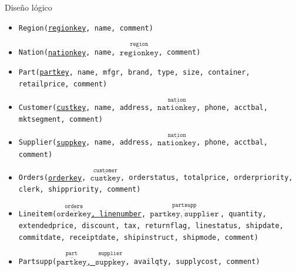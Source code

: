 \documentclass[10pt]{beamer}
\begin{document}
    \begin{frame}{Diseño lógico}
      \footnotesize
      \begin{itemize}
        \item \texttt{Region(\underline{regionkey}, name, comment)}
        \item \texttt{Nation(\underline{nationkey}, name, $\overset{
          \texttt{region}}{\overline{\texttt{regionkey}}}$, comment)}
        \item \texttt{Part(\underline{partkey}, name, mfgr, brand, type, size,
        container, retailprice, comment)}
        \item \texttt{Customer(\underline{custkey}, name, address,
        $\overset{\texttt{nation}}{\overline{\texttt{nationkey}}}$, phone,
        acctbal, mktsegment, comment)}
        \item \texttt{Supplier(\underline{suppkey}, name, address,
        $\overset{\texttt{nation}}{\overline{\texttt{nationkey}}}$, phone,
        acctbal, comment)}          \item \texttt{Orders(\underline{orderkey},
        $\overset{\texttt{customer}}{\overline{\texttt{custkey}}}$,
        orderstatus, totalprice, orderpriority, clerk, shippriority, comment)}
        \item \texttt{Lineitem(\underline{$\overset{\texttt{orders}}{
          \overline{\texttt{orderkey}}}$, linenumber}, $\overset{\texttt{
          partsupp}}{\overline{\texttt{partkey},\ \texttt{supplier}}}$,
          quantity, extendedprice, discount, tax, returnflag, linestatus,
          shipdate, commitdate, receiptdate, shipinstruct, shipmode, comment)}
        \item \texttt{Partsupp(\underline{$\overset{\texttt{part}}{
          \overline{\texttt{partkey}}}$, $\overset{\texttt{supplier}}{
          \overline{\texttt{suppkey}}}$}, availqty, supplycost, comment)}
      \end{itemize}
    \end{frame}
\end{document}
